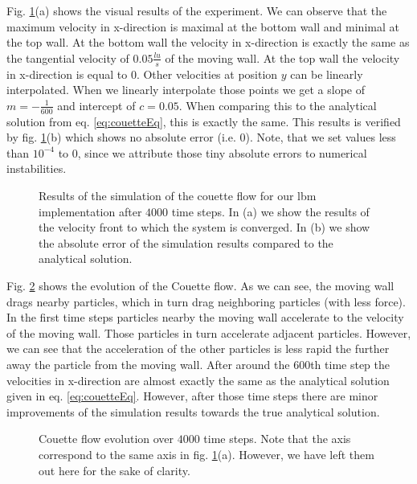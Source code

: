 \documentclass[a4paper,11pt, footsepline]{book}
\begin{document}
Fig. \ref{fig:Couette_vectors}(a) shows the visual results of the experiment. We can observe that the maximum velocity in x-direction is maximal at the bottom wall and minimal at the top wall. At the bottom wall the velocity in x-direction is exactly the same as the tangential velocity of $0.05\frac{lu}{s}$ of the moving wall. At the top wall the velocity in x-direction is equal to $0$. Other velocities at position $y$ can be linearly interpolated. When we linearly interpolate those points we get a slope of $m=-\frac{1}{600}$ and intercept of $c=0.05$. When comparing this to the analytical solution from eq. \ref{eq:couetteEq}, this is exactly the same. This results is verified by fig. \ref{fig:Couette_vectors}(b) which shows no absolute error (i.e. $0$). Note, that we set values less than $10^{-4}$ to $0$, since we attribute those tiny absolute errors to numerical instabilities.
\begin{figure}
  \begin{center}
   \caption{Results of the simulation of the couette flow for our \ac{lbm} implementation after $4000$ time steps. In (a) we show the results of the velocity front to which the system is converged. In (b) we show the absolute error of the simulation results compared to the analytical solution.}
  \label{fig:Couette_vectors}
  \end{center}
\end{figure}

Fig. \ref{fig:Couette_evolution} shows the evolution of the Couette flow. As we can see, the moving wall drags nearby particles, which in turn drag neighboring particles (with less force). In the first time steps particles nearby the moving wall accelerate to the velocity of the moving wall. Those particles in turn accelerate adjacent particles. However, we can see that the acceleration of the other particles is less rapid the further away the particle from the moving wall. After around the $600$th time step the velocities in x-direction are almost exactly the same as the analytical solution given in eq. \ref{eq:couetteEq}. However, after those time steps there are minor improvements of the simulation results towards the true analytical solution.
\begin{figure}
  \begin{center}
	\scalebox{0.7}{}
   \caption{Couette flow evolution over $4000$ time steps. Note that the axis correspond to the same axis in fig. \ref{fig:Couette_vectors}(a). However, we have left them out here for the sake of clarity.}
  \label{fig:Couette_evolution}
  \end{center}
\end{figure}
\end{document}

